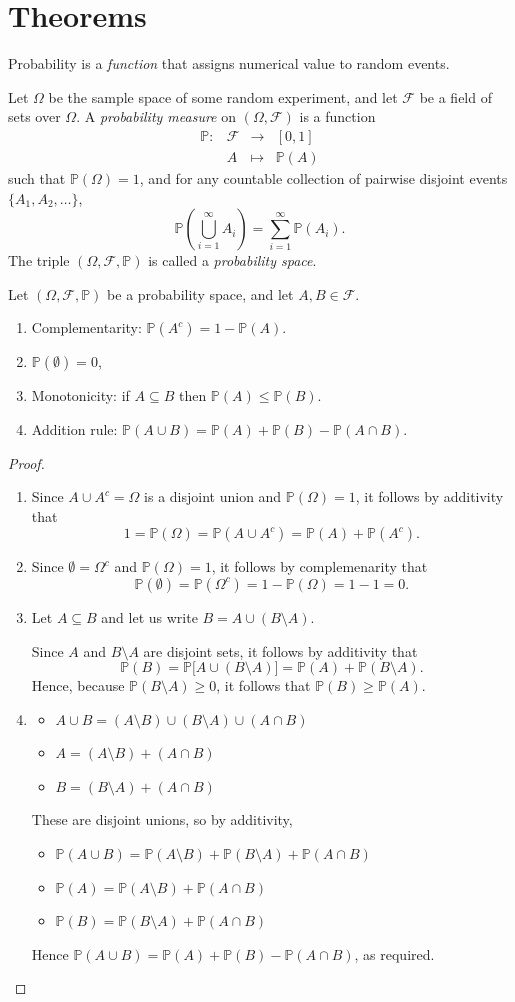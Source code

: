 \documentclass{camel}
\def\it{\item}
\def\bit{\begin{itemize}}
\def\eit{\end{itemize}}
\def\ben{\begin{enumerate}}
\def\een{\end{enumerate}}
\newcommand{\prob}{\mathbb{P}}
\begin{document}
\chapter{Theorems}\label{ch:theorems}
Probability is a \emph{function} that assigns numerical value to random events.

\begin{definition}\label{def:prob_measure}
Let $\Omega$ be the sample space of some random experiment, and let $\mathcal{F}$ be a field of sets over $\Omega$. A \emph{probability measure} on $(\Omega,\mathcal{F})$ is a function
\[
\begin{array}{rccl}
	\prob:	& \mathcal{F}	& \to	& [0,1] \\[1ex]
			& A				& \mapsto	& \prob(A)
\end{array}
\]
such that $\prob(\Omega) = 1$, and for any countable collection of pairwise disjoint events $\{A_1,A_2,\ldots\}$,
\[
\prob\left(\bigcup_{i=1}^\infty A_i\right) = \sum_{i=1}^{\infty} \prob(A_i).
\]
The triple $(\Omega,\mathcal{F},\prob)$ is called a \emph{probability space}.
\end{definition}

\begin{theorem}\label{thm:properties_of_probability_measures}
Let $(\Omega,\mathcal{F},\prob)$ be a probability space, and let $A,B\in\mathcal{F}$. 
\ben
\it Complementarity: $\prob(A^c) = 1 - \prob(A)$.
\it $\prob(\emptyset) = 0$,
\it Monotonicity: if $A\subseteq B$ then $\prob(A)\leq \prob(B)$.
\it Addition rule: $\prob(A\cup B) = \prob(A) + \prob(B) - \prob(A\cap B)$.
\een
\end{theorem}
\begin{proof}
\ben
\it %
Since $A\cup A^c=\Omega$ is a disjoint union and $\prob(\Omega)=1$, it follows by additivity that 
\[
1 = \prob(\Omega) = \prob(A\cup A^c) = \prob(A) + \prob(A^c).
\]
\it %
Since $\emptyset=\Omega^c$ and $\prob(\Omega)=1$, it follows by complemenarity that
\[
\prob(\emptyset) = \prob(\Omega^c) = 1 - \prob(\Omega) = 1 - 1 = 0.
\]
\it %
Let $A\subseteq B$ and let us write $B = A\cup (B\setminus A)$. 

Since $A$ and $B\setminus A$ are disjoint sets, it follows by additivity that
\[
\prob(B) = \prob\big[A\cup (B\setminus A)\big] = \prob(A) + \prob(B\setminus A).
\]
Hence, because $\prob(B\setminus A)\geq 0$, it follows that $\prob(B) \geq \prob(A)$.

\it %
\bit
\it $A\cup B = (A\setminus B) \cup (B\setminus A) \cup (A\cap B)$
\it $A 		 = (A\setminus B) + (A\cap B)$
\it $B 		 = (B\setminus A) + (A\cap B)$
\eit
These are disjoint unions, so by additivity, 
\bit
\it $\prob(A\cup B) = \prob(A\setminus B) + \prob(B\setminus A) + \prob(A\cap B)$
\it $\prob(A) 		= \prob(A\setminus B) + \prob(A\cap B)$
\it $\prob(B)		= \prob(B\setminus A) + \prob(A\cap B)$
\eit
Hence $\prob(A\cup B) = \prob(A) + \prob(B) - \prob(A\cap B)$, as required.
\een
\end{proof}
\end{document}
